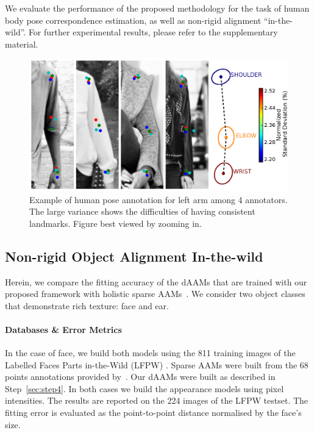 We evaluate the performance of the proposed methodology for the task of human body pose correspondence estimation, as well as non-rigid alignment ``in-the-wild''. For further experimental results, please refer to the supplementary material.


\begin{figure}[t!]
    \centering
    \includegraphics[width=\columnwidth]{resources/Fig_Variance/final}
    \caption{Example of human pose annotation for left arm among 4 annotators. The large variance shows the difficulties of having consistent landmarks. Figure best viewed by zooming in.}
    \label{fig:variance}
\end{figure}





\subsection{Non-rigid Object Alignment In-the-wild}
\label{exp:daam_benchmark}
Herein, we compare the fitting accuracy of the dAAMs that are trained with our proposed framework with holistic sparse AAMs~\cite{Cootes2001,Matthews2004}. We consider two object classes that demonstrate rich texture: face and ear.

\paragraph{Databases \& Error Metrics} In the case of face, we build both models using the 811 training images of the Labelled Faces Parts in-the-Wild (LFPW) \cite{belhumeur2013localizing}. Sparse AAMs were built from the 68 points annotations provided by~\cite{sagonas_iccv_300w_2013}. Our dAAMs were built as described in Step~\ref{sec:step4}. In both cases we build the appearance models using pixel intensities. The results are reported on the 224 images of the LFPW testset. The fitting error is evaluated as the point-to-point distance normalised by the face's size.

